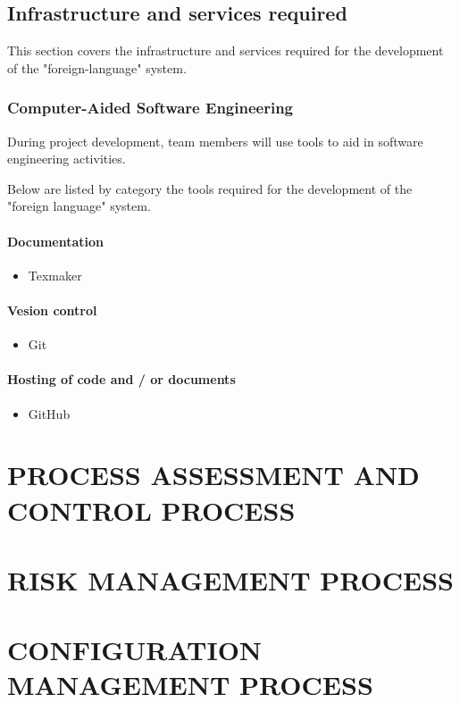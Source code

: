 \documentclass[11pt, twoside, a4paper]{book}
\begin{document}
			\section{Infrastructure and services required}
				
				This section covers the infrastructure and services required for the development of the "foreign-language" system.
				
				\subsection{Computer-Aided Software Engineering}
					
					During project development, team members will use tools to aid in software engineering activities.
					
					Below are listed by category the tools required for the development of the "foreign language" system.

					\subsubsection{Documentation}
					
						\begin{itemize}
							\item Texmaker
						\end{itemize}
					
					\subsubsection{Vesion control}
					
						\begin{itemize}
							\item Git
						\end{itemize}        	
        		
        			\subsubsection{Hosting of code and / or documents}
        				
        				\begin{itemize}
        					\item GitHub
        				\end{itemize}
        				
        \chapter{PROCESS ASSESSMENT AND CONTROL PROCESS}
                    
        \chapter{RISK MANAGEMENT PROCESS}
        
        \chapter{CONFIGURATION MANAGEMENT PROCESS}
    
    
\end{document}
